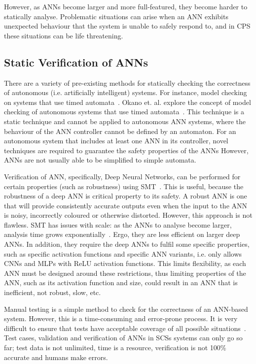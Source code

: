However, as \acp{ANN} become larger and more full-featured, they  become harder to statically analyse.
Problematic situations can arise when an \ac{ANN} exhibits unexpected behaviour that the system is unable to safely respond to, and in \ac{CPS} these situations can be life threatening.

\subsection{Static Verification of \acp{ANN}}
There are a variety of pre-existing methods for statically checking the correctness of autonomous (i.e. artificially intelligent) systems.
For instance, model checking on systems that use timed automata~\cite{timed-enf-autonomous}.
Okano et. al. explore the concept of model checking of autonomous systems that use timed automata~\cite{timed-enf-autonomous}. 
This technique is a static technique and cannot be applied to autonomous \ac{ANN} systems, where the behaviour of the \ac{ANN} controller cannot be defined by an automaton.
For an autonomous system that includes at least one \ac{ANN} in its controller, novel techniques are required to guarantee the safety properties of the \acp{ANN}
However, \acp{ANN} are not usually able to be simplified to simple automata.

Verification of \ac{ANN}, specifically, Deep Neural Networks, can be performed for certain properties (such as robustness) using \ac{SMT}~\cite{Gehr2018AI2SA,reluplex,DeepANNverify}.
This is useful, because the robustness of a deep \ac{ANN} is critical property to its safety.
A robust \ac{ANN} is one that will provide consistently accurate outputs even when the input to the \ac{ANN} is noisy, incorrectly coloured or otherwise distorted. 
However, this approach is not flawless. 
\ac{SMT} has issues with scale: as the \acp{ANN} to analyse become larger, analysis time grows exponentially~\cite{Gehr2018AI2SA}.
Ergo, they are less efficient on larger deep \acp{ANN}.
In addition, they require the deep \acp{ANN} to fulfil some specific properties, such as specific activation functions and specific \ac{ANN} variants, i.e. \cite{Gehr2018AI2SA} only allows \acp{CNN} and \acp{MLP} with \ac{ReLU} activation functions.
This limits flexibility, as each \ac{ANN} must be designed around these restrictions, thus limiting properties of the \ac{ANN}, such as its activation function and size, could result in an \ac{ANN} that is inefficient, not robust, slow, etc.

Manual testing is a simple method to check for the correctness of an \ac{ANN}-based system. 
However, this is a time-consuming and error-prone process.
It is very difficult to ensure that tests have acceptable coverage of all possible situations~\cite{ANN-test}.
Test cases, validation and verification of \acp{ANN} in \acp{SCS} systems can only go so far; test data is not unlimited, time is a resource, verification is not 100\% accurate and humans make errors. 

